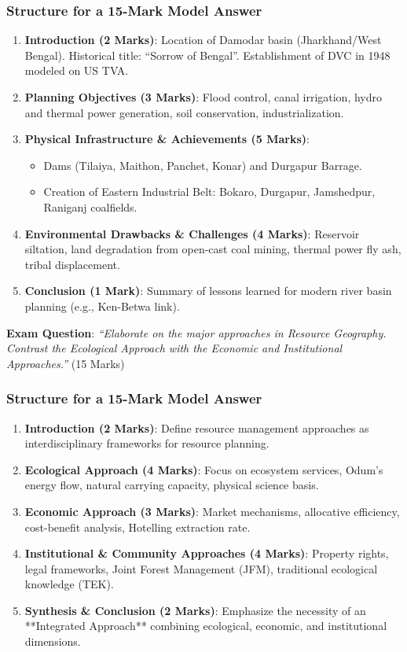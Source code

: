 \documentclass[11pt,a4paper]{article}
\begin{document}
\subsubsection{Structure for a 15-Mark Model Answer}
\begin{enumerate}[leftmargin=*]
  \item \textbf{Introduction (2 Marks)}: Location of Damodar basin (Jharkhand/West Bengal). Historical title: ``Sorrow of Bengal''. Establishment of DVC in 1948 modeled on US TVA.
  \item \textbf{Planning Objectives (3 Marks)}: Flood control, canal irrigation, hydro and thermal power generation, soil conservation, industrialization.
  \item \textbf{Physical Infrastructure \& Achievements (5 Marks)}:
  \begin{itemize}
    \item Dams (Tilaiya, Maithon, Panchet, Konar) and Durgapur Barrage.
    \item Creation of Eastern Industrial Belt: Bokaro, Durgapur, Jamshedpur, Raniganj coalfields.
  \end{itemize}
  \item \textbf{Environmental Drawbacks \& Challenges (4 Marks)}: Reservoir siltation, land degradation from open-cast coal mining, thermal power fly ash, tribal displacement.
  \item \textbf{Conclusion (1 Mark)}: Summary of lessons learned for modern river basin planning (e.g., Ken-Betwa link).
\end{enumerate}

\begin{exambox}
\textbf{Exam Question}: \textit{``Elaborate on the major approaches in Resource Geography. Contrast the Ecological Approach with the Economic and Institutional Approaches.''} (15 Marks)
\end{exambox}

\subsubsection{Structure for a 15-Mark Model Answer}
\begin{enumerate}[leftmargin=*]
  \item \textbf{Introduction (2 Marks)}: Define resource management approaches as interdisciplinary frameworks for resource planning.
  \item \textbf{Ecological Approach (4 Marks)}: Focus on ecosystem services, Odum's energy flow, natural carrying capacity, physical science basis.
  \item \textbf{Economic Approach (3 Marks)}: Market mechanisms, allocative efficiency, cost-benefit analysis, Hotelling extraction rate.
  \item \textbf{Institutional \& Community Approaches (4 Marks)}: Property rights, legal frameworks, Joint Forest Management (JFM), traditional ecological knowledge (TEK).
  \item \textbf{Synthesis \& Conclusion (2 Marks)}: Emphasize the necessity of an **Integrated Approach** combining ecological, economic, and institutional dimensions.
\end{enumerate}
\end{document}
